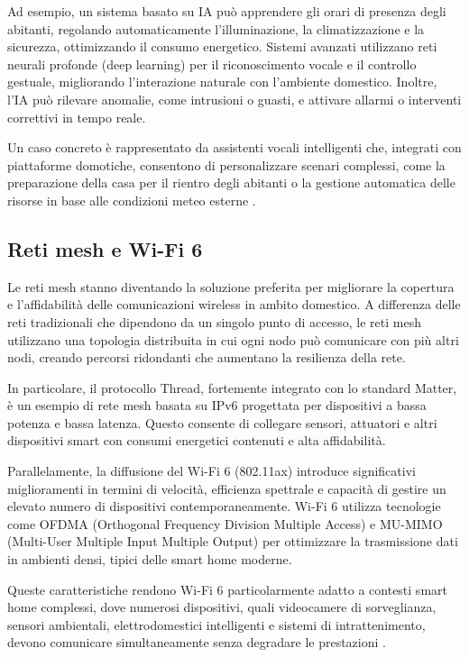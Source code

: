 Ad esempio, un sistema basato su IA può apprendere gli orari di presenza degli abitanti, regolando automaticamente l’illuminazione, la climatizzazione e la sicurezza, ottimizzando il consumo energetico. Sistemi avanzati utilizzano reti neurali profonde (deep learning) per il riconoscimento vocale e il controllo gestuale, migliorando l'interazione naturale con l’ambiente domestico. Inoltre, l’IA può rilevare anomalie, come intrusioni o guasti, e attivare allarmi o interventi correttivi in tempo reale.

Un caso concreto è rappresentato da assistenti vocali intelligenti che, integrati con piattaforme domotiche, consentono di personalizzare scenari complessi, come la preparazione della casa per il rientro degli abitanti o la gestione automatica delle risorse in base alle condizioni meteo esterne \parencite{ieeeAI, chen2023smart}.

\subsection{Reti mesh e Wi-Fi 6}
Le reti mesh stanno diventando la soluzione preferita per migliorare la copertura e l’affidabilità delle comunicazioni wireless in ambito domestico. A differenza delle reti tradizionali che dipendono da un singolo punto di accesso, le reti mesh utilizzano una topologia distribuita in cui ogni nodo può comunicare con più altri nodi, creando percorsi ridondanti che aumentano la resilienza della rete.

In particolare, il protocollo Thread, fortemente integrato con lo standard Matter, è un esempio di rete mesh basata su IPv6 progettata per dispositivi a bassa potenza e bassa latenza. Questo consente di collegare sensori, attuatori e altri dispositivi smart con consumi energetici contenuti e alta affidabilità.

Parallelamente, la diffusione del Wi-Fi 6 (802.11ax) introduce significativi miglioramenti in termini di velocità, efficienza spettrale e capacità di gestire un elevato numero di dispositivi contemporaneamente. Wi-Fi 6 utilizza tecnologie come OFDMA (Orthogonal Frequency Division Multiple Access) e MU-MIMO (Multi-User Multiple Input Multiple Output) per ottimizzare la trasmissione dati in ambienti densi, tipici delle smart home moderne.

Queste caratteristiche rendono Wi-Fi 6 particolarmente adatto a contesti smart home complessi, dove numerosi dispositivi, quali videocamere di sorveglianza, sensori ambientali, elettrodomestici intelligenti e sistemi di intrattenimento, devono comunicare simultaneamente senza degradare le prestazioni \parencite{etsiWifi6, zhang2021wifi6}.

